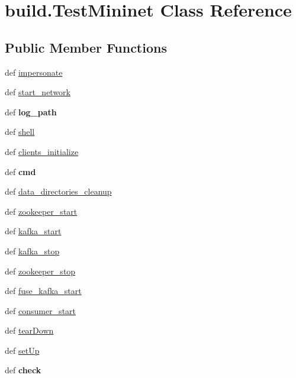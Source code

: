 \hypertarget{classbuild_1_1TestMininet}{\section{build.\-Test\-Mininet \-Class \-Reference}
\label{classbuild_1_1TestMininet}
}
\subsection*{\-Public \-Member \-Functions}
\begin{DoxyCompactItemize}
\item 
def \hyperlink{classbuild_1_1TestMininet_a8e289e361dade20ec1ad1c4e21cadd1a}{impersonate}
\item 
def \hyperlink{classbuild_1_1TestMininet_ae28256d061cb92ca35a47abfa3352c6f}{start\-\_\-network}
\item 
\hypertarget{classbuild_1_1TestMininet_a8523c1dd0a6bb4fbd65f52c7a819924e}{def {\bfseries log\-\_\-path}}\label{classbuild_1_1TestMininet_a8523c1dd0a6bb4fbd65f52c7a819924e}

\item 
def \hyperlink{classbuild_1_1TestMininet_a7ae01ec8dc3e0a8d7768884a56dd2e96}{shell}
\item 
def \hyperlink{classbuild_1_1TestMininet_aa222c3691d93c73ac4e047e163fa791c}{clients\-\_\-initialize}
\item 
\hypertarget{classbuild_1_1TestMininet_aa13c4ec02d058002da3c771aff0114bd}{def {\bfseries cmd}}\label{classbuild_1_1TestMininet_aa13c4ec02d058002da3c771aff0114bd}

\item 
def \hyperlink{classbuild_1_1TestMininet_a83b14b12435ff9ffa7332fc2b8e197ae}{data\-\_\-directories\-\_\-cleanup}
\item 
def \hyperlink{classbuild_1_1TestMininet_aa3eddff2c619b28456be8a68dfe0c8cd}{zookeeper\-\_\-start}
\item 
def \hyperlink{classbuild_1_1TestMininet_abea6fef76c2d624f8ab4f9834fa30825}{kafka\-\_\-start}
\item 
def \hyperlink{classbuild_1_1TestMininet_a98246d1c87247c0a177700aaf62b9bf8}{kafka\-\_\-stop}
\item 
def \hyperlink{classbuild_1_1TestMininet_a1fbdfc51881cb089360d8fae89f47430}{zookeeper\-\_\-stop}
\item 
def \hyperlink{classbuild_1_1TestMininet_a731ba3e4c942e40ebf114bfd1b01a287}{fuse\-\_\-kafka\-\_\-start}
\item 
def \hyperlink{classbuild_1_1TestMininet_a8239e151542b50fc2152cfd431a71095}{consumer\-\_\-start}
\item 
def \hyperlink{classbuild_1_1TestMininet_a12a916934ea6a0ebf8e8e530f66575ac}{tear\-Down}
\item 
def \hyperlink{classbuild_1_1TestMininet_a9aaae0dd51d2509a40d597bdb90d375a}{set\-Up}
\item 
\hypertarget{classbuild_1_1TestMininet_aadb6a354f440f7dcbf95529230a51ac7}{def {\bfseries check}}\label{classbuild_1_1TestMininet_aadb6a354f440f7dcbf95529230a51ac7}


\end{DoxyCompactItemize}
